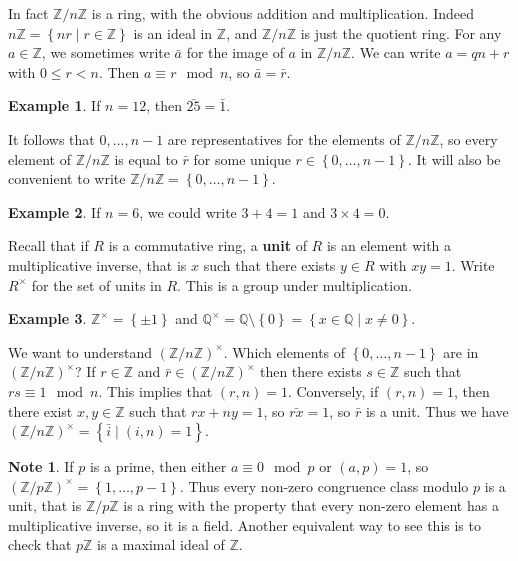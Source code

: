 \documentclass{article}
\newcommand{\Z}{\mathbb{Z}}
\newcommand{\Q}{\mathbb{Q}}
\newcommand{\rb}[1]{\left( #1 \right)}
\newcommand{\cb}[1]{\left\{ #1 \right\}}
\newcommand{\unit}[1]{\rb{\Z / #1\Z}^\times}
\theoremstyle{definition}\newtheorem{definition}{Definition}
\theoremstyle{definition}\newtheorem*{remark}{Remark}
\theoremstyle{definition}\newtheorem*{example}{Example}
\theoremstyle{definition}\newtheorem*{note}{Note}
\begin{document}
In fact $ \Z / n\Z $ is a ring, with the obvious addition and multiplication. Indeed $ n\Z = \cb{nr \mid r \in \Z} $ is an ideal in $ \Z $, and $ \Z / n\Z $ is just the quotient ring. For any $ a \in \Z $, we sometimes write $ \bar{a} $ for the image of $ a $ in $ \Z / n\Z $. We can write $ a = qn + r $ with $ 0 \le r < n $. Then $ a \equiv r \mod n $, so $ \bar{a} = \bar{r} $.

\begin{example}
If $ n = 12 $, then $ \bar{25} = \bar{1} $.
\end{example}

It follows that $ 0, \dots, n - 1 $ are representatives for the elements of $ \Z / n\Z $, so every element of $ \Z / n\Z $ is equal to $ \bar{r} $ for some unique $ r \in \cb{0, \dots, n - 1} $. It will also be convenient to write $ \Z / n\Z = \cb{0, \dots, n - 1} $.

\begin{example}
If $ n = 6 $, we could write $ 3 + 4 = 1 $ and $ 3 \times 4 = 0 $.
\end{example}

Recall that if $ R $ is a commutative ring, a \textbf{unit} of $ R $ is an element with a multiplicative inverse, that is $ x $ such that there exists $ y \in R $ with $ xy = 1 $. Write $ R^\times $ for the set of units in $ R $. This is a group under multiplication.

\begin{example}
$ \Z^\times = \cb{\pm 1} $ and $ \Q^\times = \Q \setminus \cb{0} = \cb{x \in \Q \mid x \ne 0} $.
\end{example}

We want to understand $ \unit{n} $. Which elements of $ \cb{0, \dots, n - 1} $ are in $ \unit{n} $? If $ r \in \Z $ and $ \bar{r} \in \unit{n} $ then there exists $ s \in \Z $ such that $ rs \equiv 1 \mod n $. This implies that $ \rb{r, n} = 1 $. Conversely, if $ \rb{r, n} = 1 $, then there exist $ x, y \in \Z $ such that $ rx + ny = 1 $, so $ \bar{rx} = 1 $, so $ \bar{r} $ is a unit. Thus we have $ \unit{n} = \cb{\bar{i} \mid \rb{i, n} = 1} $.

\begin{note}
If $ p $ is a prime, then either $ a \equiv 0 \mod p $ or $ \rb{a, p} = 1 $, so $ \unit{p} = \cb{1, \dots, p - 1} $. Thus every non-zero congruence class modulo $ p $ is a unit, that is $ \Z / p\Z $ is a ring with the property that every non-zero element has a multiplicative inverse, so it is a field. Another equivalent way to see this is to check that $ p\Z $ is a maximal ideal of $ \Z $.
\end{note}
\end{document}
